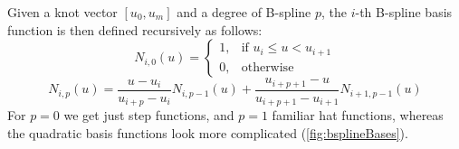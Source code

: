Given a knot vector $[u_{0}, u_{m}]$ and a degree of B-spline $p$, the $i$-th B-spline basis function is then defined recursively as follows:
\begin{equation}
N_{i,0}(u) =  \begin{cases} 1, & \mbox{if } u_{i} \leq u < u_{i+1} \\ 0, & \mbox{otherwise } \end{cases}
\end{equation} 
\begin{equation}
N_{i,p}(u) = \frac{u - u_{i}}{u_{i+p} - u_{i}}N_{i, p-1}(u)  + \frac{u_{i+p+1}-u}{u_{i+p+1} - u_{i+1}}N_{i+1, p-1}(u)
\end{equation}
For $p=0$ we get just step functions, and $p=1$ familiar hat functions, whereas the quadratic basis functions look more complicated (\autoref{fig:bsplineBases}).
